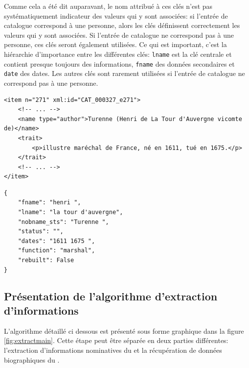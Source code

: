 Comme cela a été dit auparavant, le nom attribué à ces clés n'est pas systématiquement indicateur des valeurs qui y sont associées: si l'entrée de catalogue correspond à une personne, alors les clés définissent correctement les valeurs qui y sont associées. Si l'entrée de catalogue ne correspond pas à une personne, ces clés seront également utilisées. Ce qui est important, c'est la hiérarchie d'importance entre les différentes clés: \texttt{lname} est la clé centrale et contient presque toujours des informations, \texttt{fname} des données secondaires et \texttt{date} des dates. Les autres clés sont rarement utilisées si l'entrée de catalogue ne correspond pas à une personne.

\begin{listing}
	\begin{verbatim}
<item n="271" xml:id="CAT_000327_e271">
	<!-- ... -->
	<name type="author">Turenne (Henri de La Tour d'Auvergne vicomte de)</name>
	<trait>
		<p>illustre maréchal de France, né en 1611, tué en 1675.</p>
	</trait>
	<!-- ... -->
</item>
	\end{verbatim}
	\caption{L'entrée \xmltei{} à partir de laquelle des données sont extraites}
	\label{code:prepin}
\end{listing}

\begin{listing}
	\begin{verbatim}
{
	"fname": "henri ", 
	"lname": "la tour d'auvergne", 
	"nobname_sts": "Turenne ", 
	"status": "", 
	"dates": "1611 1675 ", 
	"function": "marshal", 
	"rebuilt": False
}
	\end{verbatim}
	\caption{La sortie \json{} correspondante}
	\label{code:prepout}
\end{listing}

\subsection{Présentation de l'algorithme d'extraction d'informations}
L'algorithme détaillé ci dessous est présenté sous forme graphique dans la figure \ref{fig:extractmain}. Cette étape peut être séparée en deux parties différentes: l'extraction d'informations nominatives du \tname{} et la récupération de données biographiques du \ttrait{}.

